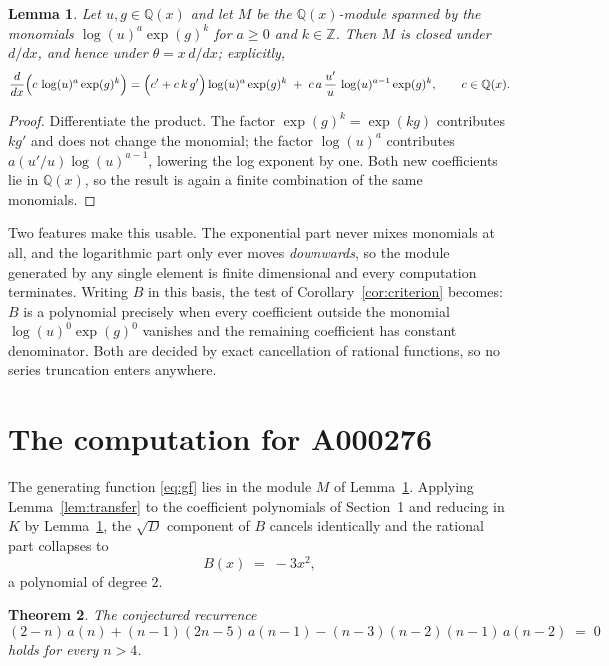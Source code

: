 \documentclass[11pt,a4paper]{article}
\theoremstyle{plain}
\newtheorem{theorem}{Theorem}
\newtheorem{lemma}[theorem]{Lemma}
\theoremstyle{definition}
\begin{document}
\begin{lemma}\label{lem:field}
Let $u,g\in\mathbb{Q}(x)$ and let $M$ be the $\mathbb{Q}(x)$-module spanned by the
monomials $\log(u)^{a}\exp(g)^{k}$ for $a\ge0$ and $k\in\mathbb{Z}$. Then $M$ is closed
under $d/dx$, and hence under $\theta=x\,d/dx$; explicitly,
\[
\frac{d}{dx}\Bigl(c\,\log(u)^{a}\exp(g)^{k}\Bigr)
=\Bigl(c'+c\,k\,g'\Bigr)\log(u)^{a}\exp(g)^{k}
\;+\;c\,a\,\frac{u'}{u}\,\log(u)^{a-1}\exp(g)^{k},
\qquad c\in\mathbb{Q}(x).
\]
\end{lemma}

\begin{proof}
Differentiate the product. The factor $\exp(g)^{k}=\exp(kg)$ contributes $kg'$ and does
not change the monomial; the factor $\log(u)^{a}$ contributes $a(u'/u)\log(u)^{a-1}$,
lowering the log exponent by one. Both new coefficients lie in $\mathbb{Q}(x)$, so the
result is again a finite combination of the same monomials.
\end{proof}

Two features make this usable. The exponential part never mixes monomials at all, and the
logarithmic part only ever moves \emph{downwards}, so the module generated by any single
element is finite dimensional and every computation terminates. Writing $B$ in this basis,
the test of Corollary~\ref{cor:criterion} becomes: $B$ is a polynomial precisely when every
coefficient outside the monomial $\log(u)^{0}\exp(g)^{0}$ vanishes and the remaining
coefficient has constant denominator. Both are decided by exact cancellation of rational
functions, so no series truncation enters anywhere.

\section{The computation for A000276}

The generating function \eqref{eq:gf} lies in the module $M$ of
Lemma~\ref{lem:field}.
Applying Lemma~\ref{lem:transfer} to the coefficient polynomials of Section~1 and reducing
in $K$ by Lemma~\ref{lem:field}, the $\sqrt{D}$ component of $B$ cancels identically and
the rational part collapses to
\[
B(x)\;=\;- 3 x^{2} ,
\]
a polynomial of degree $2$.

\begin{theorem}
The conjectured recurrence
\[
(2 - n)\,a(n) + \left(n - 1\right) \left(2 n - 5\right)\,a(n-1) -  \left(n - 3\right) \left(n - 2\right) \left(n - 1\right)\,a(n-2) \;=\;0
\]
holds for every $n>4$.
\end{theorem}
\end{document}
